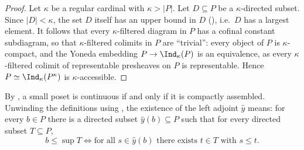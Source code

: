 	\begin{proof}
		Let $\kappa$ be a regular cardinal with $\kappa > |P|$. Let $D \subseteq P$ be a $\kappa$-directed subset. Since $|D| < \kappa$, the set $D$ itself has an upper bound in $D$ (), i.e.\ $D$ has a largest element. It follows that every $\kappa$-filtered diagram in $P$ has a cofinal constant subdiagram, so that $\kappa$-filtered colimits in $P$ are ``trivial'': every object of $P$ is $\kappa$-compact, and the Yoneda embedding $P \to \Ind_{\kappa}(P)$ is an equivalence, as every $\kappa$-filtered colimit of representable presheaves on $P$ is representable. Hence $P \simeq \Ind_{\kappa}(P^{\kappa})$ is $\kappa$-accessible.
	\end{proof}


	By , a small poset is continuous if and only if it is compactly assembled. Unwinding the definitions using , the existence of the left adjoint $\hat{y}$ means: for every $b \in P$ there is a directed subset $\hat{y}(b) \subseteq P$ such that for every directed subset $T \subseteq P$,
	\begin{equation}
		\label{eq:Yhat_Poset}
		b \leq \sup T \iff \text{for all } s \in \hat{y}(b) \text{ there exists } t \in T \text{ with } s \leq t.
	\end{equation}



